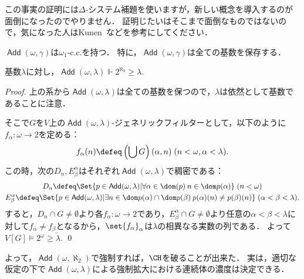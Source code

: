 \documentclass[a4j]{ltjsarticle}
\renewcommand{\Add}{\mathop{\mathsf{Add}}}
\begin{document}
この事実の証明には$\Delta$-システム補題を使いますが，新しい概念を導入するのが面倒になったのでやりません．
証明じたいはそこまで面倒なものではないので，気になった人はKunen~\cite{Kunen:2011}などを参考にしてください．

\begin{corollary}
 $\Add(\omega, \gamma)$は$\omega_1$-c.c.を持つ．
 特に，$\Add(\omega, \gamma)$は全ての基数を保存する．
\end{corollary}

\begin{lemma}
 基数$\lambda$に対し，$\Add(\omega, \lambda) \Vdash 2^{\aleph_0} \geq \lambda$.
\end{lemma}
\begin{proof}
 上の系から$\Add(\omega, \lambda)$は全ての基数を保つので，$\lambda$は依然として基数であることに注意．

 そこで$G$を$V$上の$\Add(\omega, \lambda)$-ジェネリックフィルターとして，以下のように$f_\alpha : \omega \to 2$を定める：
 \[
  f_\alpha(n) \defeq \left(\bigcup G\right)(\alpha, n)\;(n < \omega, \alpha < \lambda).
 \]
 この時，次の$D_n, E^\alpha_\beta$はそれぞれ$\Add(\omega, \lambda)$で稠密である：
 \begin{gather*}
   D_n \defeq \Set{p \in \Add(\omega, \lambda) | \forall \alpha \in \dom(p) \: n \in \dom p(\alpha)}\; (n < \omega)\\
  E^\alpha_\beta \defeq \Set{p \in \Add(\omega, \lambda) | \exists n \in \dom p(\alpha) \cap \dom p(\beta) \: p(\alpha)(n) \neq p(\beta)(n)} \; (\alpha < \beta < \lambda).
 \end{gather*}
 すると，$D_n \cap G \neq \emptyset$より各$f_\alpha : \omega \to 2$であり，$E^\alpha_\beta \cap G \neq \emptyset$より任意の$\alpha < \beta < \lambda$に対して$f_\alpha \neq f_\beta$となるから，$\set{f_\alpha}_\alpha$は$\lambda$の相異なる実数の列である．
 よって$V[G] \models 2^\omega \geq \check{\lambda}$. \qed
\end{proof}

よって，$\Add(\omega, \aleph_2)$で強制すれば，$\CH$を破ることが出来た．
実は，適切な仮定の下で$\Add(\omega, \lambda)$による強制拡大における連続体の濃度は決定できる．
\end{document}
